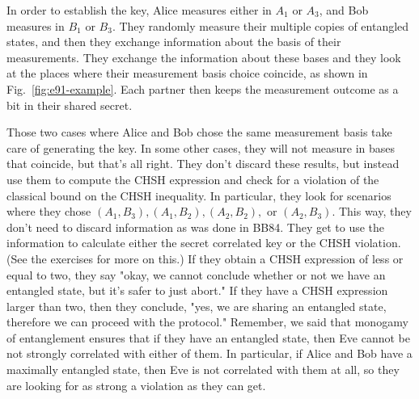 In order to establish the key, Alice measures either in $A_1$ or $A_3$, and Bob measures in $B_1$ or $B_3$. They randomly measure their multiple copies of entangled states, and then they exchange information about the basis of their measurements. 
They exchange the information about these bases and they look at the places where their measurement basis choice coincide, as shown in Fig.~\ref{fig:e91-example}.  Each partner then keeps the measurement outcome as a bit in their shared secret.

Those two cases where Alice and Bob chose the same measurement basis take care of generating the key. In some other cases, they will not measure in bases that coincide, but that's all right. They don't discard these results, but instead  use them to compute the CHSH expression and check for a violation of the classical bound on the CHSH inequality. In particular, they look for scenarios where they chose $(A_1,B_3), (A_1,B_2), (A_2,B_2),$ or $(A_2,B_3)$.
This way, they don't need to discard information as was done in BB84. They get to use the information to calculate either the secret correlated key or the CHSH violation. (See the exercises for more on this.) If they obtain a CHSH expression of less or equal to two, they say "okay, we cannot conclude whether or not we have an entangled state, but it's safer to just abort."  If they have a CHSH expression larger than two, then they conclude, "yes, we are sharing an entangled state, therefore we can proceed with the protocol." Remember, we said that monogamy of entanglement ensures that if they have an entangled state, then Eve cannot be not strongly correlated with either of them.  In particular, if Alice and Bob have a maximally entangled state, then Eve is not correlated with them at all, so they are looking for as strong a violation as they can get.

